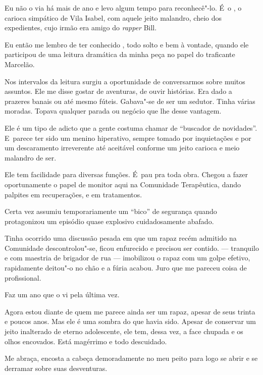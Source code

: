  

Eu não o via há mais de ano e levo algum tempo para reconhecê"-lo. É~o
, o carioca simpático de Vila Isabel, com aquele jeito malandro, cheio
dos expedientes, cujo irmão era amigo do \emph{rapper}  Bill.

Eu então me lembro de ter conhecido , todo solto e bem à vontade,
quando ele participou de uma leitura dramática da minha peça no papel do
traficante Marcelão.

Nos intervalos da leitura surgiu a oportunidade de conversarmos sobre
muitos assuntos. Ele me disse gostar de aventuras, de ouvir histórias.
Era dado a prazeres banais ou até mesmo fúteis. Gabava"-se de ser um
sedutor. Tinha várias moradas. Topava qualquer parada ou negócio que lhe
desse vantagem.

Ele é um tipo de adicto que a gente costuma chamar de ``buscador de
novidades''. E~parece ter sido um menino hiperativo, sempre tomado por
inquietações e por um descaramento irreverente até aceitável conforme um
jeito carioca e meio malandro de ser.

Ele tem facilidade para diversas funções. É~pau pra toda obra. Chegou a
fazer oportunamente o papel de monitor aqui na Comunidade Terapêutica,
dando palpites em recuperações, e em tratamentos.

Certa vez assumiu temporariamente um ``bico'' de segurança quando
protagonizou um episódio quase explosivo cuidadosamente abafado.

Tinha ocorrido uma discussão pesada em que um rapaz recém admitido na
Comunidade descontrolou"-se, ficou enfurecido e precisou ser contido. 
--- tranquilo e com maestria de brigador de rua --- imobilizou o rapaz
com um golpe efetivo, rapidamente deitou"-o no chão e a fúria acabou.
Juro que me pareceu coisa de profissional.

\asterisc{}

Faz um ano que o vi pela última vez.

Agora estou diante de quem me parece ainda ser um rapaz, apesar de seus
trinta e poucos anos. Mas ele é uma sombra do que havia sido. Apesar de
conservar um jeito inalterado de eterno adolescente, ele tem, dessa vez,
a face chupada e os olhos encovados. Está magérrimo e todo descuidado.

Me abraça, encosta a cabeça demoradamente no meu peito para logo se
abrir e se derramar sobre suas desventuras.

